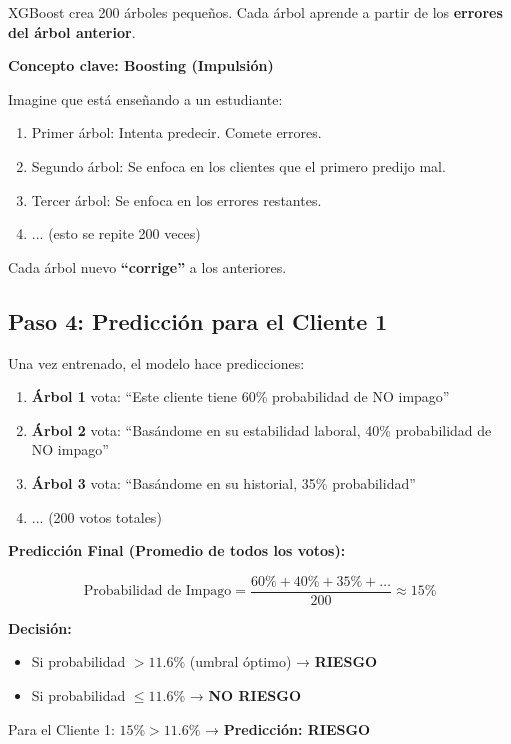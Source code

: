 \documentclass[11pt,a4paper,spanish]{article}
\begin{document}
XGBoost crea 200 árboles pequeños. Cada árbol aprende a partir de los \textbf{errores del árbol anterior}.

\textbf{Concepto clave: Boosting (Impulsión)}

Imagine que está enseñando a un estudiante:

\begin{enumerate}
    \item Primer árbol: Intenta predecir. Comete errores.
    \item Segundo árbol: Se enfoca en los clientes que el primero predijo mal.
    \item Tercer árbol: Se enfoca en los errores restantes.
    \item ... (esto se repite 200 veces)
\end{enumerate}

Cada árbol nuevo \textbf{``corrige''} a los anteriores.

\subsection{Paso 4: Predicción para el Cliente 1}

Una vez entrenado, el modelo hace predicciones:

\begin{enumerate}
    \item \textbf{Árbol 1} vota: ``Este cliente tiene 60\% probabilidad de NO impago''
    \item \textbf{Árbol 2} vota: ``Basándome en su estabilidad laboral, 40\% probabilidad de NO impago''
    \item \textbf{Árbol 3} vota: ``Basándome en su historial, 35\% probabilidad''
    \item ... (200 votos totales)
\end{enumerate}

\textbf{Predicción Final (Promedio de todos los votos):}

\[
\text{Probabilidad de Impago} = \frac{60\% + 40\% + 35\% + \ldots}{200} \approx 15\%
\]

\textbf{Decisión:}
\begin{itemize}
    \item Si probabilidad $> 11.6\%$ (umbral óptimo) → \textbf{RIESGO}
    \item Si probabilidad $\leq 11.6\%$ → \textbf{NO RIESGO}
\end{itemize}

Para el Cliente 1: $15\% > 11.6\%$ → \textbf{Predicción: RIESGO}
\end{document}
